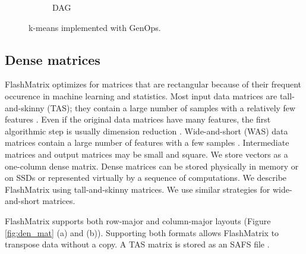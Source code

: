 \begin{figure}
\begin{subfigure}{.25\textwidth}
	\label{fig:dag}
	\caption{DAG}
	\end{subfigure}
  \vspace{-12pt}
	\caption{k-means implemented with GenOps.}
	\label{fig:kmeans}
  \vspace{-8pt}
\end{figure}

\vspace{-8pt}
\subsection{Dense matrices}
\vspace{-4pt}
FlashMatrix optimizes for matrices that are rectangular because
of their frequent occurence in machine learning and statistics.
Most input data matrices are tall-and-skinny (TAS); they contain
a large number of samples with a relatively few features \cite{}. 
Even if the original data matrices have many features,
the first algorithmic step is usually dimension reduction \cite{}. 
Wide-and-short (WAS) data matrices contain a large number of features with
a few samples \cite{}. Intermediate matrices and output matrices may
be small and square. We store vectors as a one-column dense matrix.
Dense matrices can be stored physically in memory or on SSDs or represented
virtually by a sequence of computations.
We describe FlashMatrix using tall-and-skinny matrices.  We use similar strategies for wide-and-short matrices.



FlashMatrix supports both row-major and column-major
layouts (Figure \ref{fig:den_mat} (a) and (b)).  Supporting both formats
allows FlashMatrix to transpose data without a copy. A TAS matrix is stored
as an SAFS file \cite{safs}.

